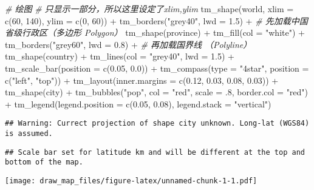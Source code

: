 \documentclass[
]{article}
\newenvironment{Shaded}{\begin{snugshade}}{\end{snugshade}}
\newcommand{\AttributeTok}[1]{\textcolor[rgb]{0.77,0.63,0.00}{#1}}
\newcommand{\CommentTok}[1]{\textcolor[rgb]{0.56,0.35,0.01}{\textit{#1}}}
\newcommand{\DecValTok}[1]{\textcolor[rgb]{0.00,0.00,0.81}{#1}}
\newcommand{\FloatTok}[1]{\textcolor[rgb]{0.00,0.00,0.81}{#1}}
\newcommand{\FunctionTok}[1]{\textcolor[rgb]{0.00,0.00,0.00}{#1}}
\newcommand{\NormalTok}[1]{#1}
\newcommand{\SpecialCharTok}[1]{\textcolor[rgb]{0.00,0.00,0.00}{#1}}
\newcommand{\StringTok}[1]{\textcolor[rgb]{0.31,0.60,0.02}{#1}}
\begin{document}
\begin{Shaded}
\begin{Highlighting}[]
\CommentTok{\# 绘图}
\CommentTok{\# 只显示一部分，所以这里设定了xlim,ylim}
\FunctionTok{tm\_shape}\NormalTok{(world,}
         \AttributeTok{xlim =} \FunctionTok{c}\NormalTok{(}\DecValTok{60}\NormalTok{, }\DecValTok{140}\NormalTok{),}
         \AttributeTok{ylim =} \FunctionTok{c}\NormalTok{(}\DecValTok{0}\NormalTok{, }\DecValTok{60}\NormalTok{)) }\SpecialCharTok{+}
    \FunctionTok{tm\_borders}\NormalTok{(}\StringTok{"grey40"}\NormalTok{, }\AttributeTok{lwd =} \FloatTok{1.5}\NormalTok{) }\SpecialCharTok{+}
    \CommentTok{\# 先加载中国省级行政区（多边形 Polygon）}
    \FunctionTok{tm\_shape}\NormalTok{(province) }\SpecialCharTok{+}
    \FunctionTok{tm\_fill}\NormalTok{(}\AttributeTok{col =} \StringTok{"white"}\NormalTok{) }\SpecialCharTok{+}
    \FunctionTok{tm\_borders}\NormalTok{(}\StringTok{"grey60"}\NormalTok{,}
               \AttributeTok{lwd =} \FloatTok{0.8}\NormalTok{) }\SpecialCharTok{+}
    \CommentTok{\# 再加载国界线 （Polyline）}
    \FunctionTok{tm\_shape}\NormalTok{(country) }\SpecialCharTok{+}
    \FunctionTok{tm\_lines}\NormalTok{(}\AttributeTok{col =} \StringTok{"grey40"}\NormalTok{,}
             \AttributeTok{lwd =} \FloatTok{1.5}\NormalTok{) }\SpecialCharTok{+}
    \FunctionTok{tm\_scale\_bar}\NormalTok{(}\AttributeTok{position =} \FunctionTok{c}\NormalTok{(}\FloatTok{0.05}\NormalTok{, }\FloatTok{0.0}\NormalTok{)) }\SpecialCharTok{+}
    \FunctionTok{tm\_compass}\NormalTok{(}\AttributeTok{type =} \StringTok{"4star"}\NormalTok{,}
               \AttributeTok{position =} \FunctionTok{c}\NormalTok{(}\StringTok{"left"}\NormalTok{, }\StringTok{"top"}\NormalTok{)) }\SpecialCharTok{+}
    \FunctionTok{tm\_layout}\NormalTok{(}\AttributeTok{inner.margins =} \FunctionTok{c}\NormalTok{(}\FloatTok{0.12}\NormalTok{, }\FloatTok{0.03}\NormalTok{, }\FloatTok{0.08}\NormalTok{, }\FloatTok{0.03}\NormalTok{)) }\SpecialCharTok{+}
    \FunctionTok{tm\_shape}\NormalTok{(city) }\SpecialCharTok{+}
    \FunctionTok{tm\_bubbles}\NormalTok{(}\StringTok{"pop"}\NormalTok{,}
               \AttributeTok{col =} \StringTok{"red"}\NormalTok{,}
               \AttributeTok{scale =}\NormalTok{ .}\DecValTok{8}\NormalTok{,}
               \AttributeTok{border.col =} \StringTok{"red"}\NormalTok{) }\SpecialCharTok{+}
    \FunctionTok{tm\_legend}\NormalTok{(}\AttributeTok{legend.position =} \FunctionTok{c}\NormalTok{(}\FloatTok{0.05}\NormalTok{, }\FloatTok{0.08}\NormalTok{),}
              \AttributeTok{legend.stack =} \StringTok{"vertical"}\NormalTok{)}
\end{Highlighting}
\end{Shaded}

\begin{verbatim}
## Warning: Currect projection of shape city unknown. Long-lat (WGS84) is assumed.
\end{verbatim}

\begin{verbatim}
## Scale bar set for latitude km and will be different at the top and bottom of the map.
\end{verbatim}

\texttt{[image: draw\_map\_files/figure-latex/unnamed-chunk-1-1.pdf]}
\end{document}
